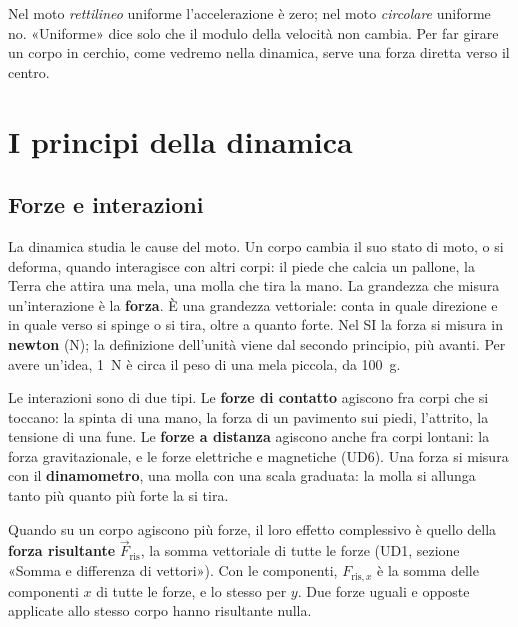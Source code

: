 \begin{attenzione}
Nel moto \emph{rettilineo} uniforme l'accelerazione è zero; nel moto \emph{circolare} uniforme no. «Uniforme» dice solo che il modulo della velocità non cambia. Per far girare un corpo in cerchio, come vedremo nella dinamica, serve una forza diretta verso il centro.
\end{attenzione}



\section{I principi della dinamica}
\label{sec:ud2-principi}

\subsection{Forze e interazioni}

La dinamica studia le cause del moto. Un corpo cambia il suo stato di moto, o si deforma, quando interagisce con altri corpi: il piede che calcia un pallone, la Terra che attira una mela, una molla che tira la mano. La grandezza che misura un'interazione è la \textbf{forza}. È una grandezza vettoriale: conta in quale direzione e in quale verso si spinge o si tira, oltre a quanto forte. Nel SI la forza si misura in \textbf{newton} (\si{\newton}); la definizione dell'unità viene dal secondo principio, più avanti. Per avere un'idea, \SI{1}{\newton} è circa il peso di una mela piccola, da \SI{100}{\gram}.

Le interazioni sono di due tipi. Le \textbf{forze di contatto} agiscono fra corpi che si toccano: la spinta di una mano, la forza di un pavimento sui piedi, l'attrito, la tensione di una fune. Le \textbf{forze a distanza} agiscono anche fra corpi lontani: la forza gravitazionale, e le forze elettriche e magnetiche (UD6). Una forza si misura con il \textbf{dinamometro}, una molla con una scala graduata: la molla si allunga tanto più quanto più forte la si tira.

Quando su un corpo agiscono più forze, il loro effetto complessivo è quello della \textbf{forza risultante} $\vec F_{\text{ris}}$, la somma vettoriale di tutte le forze (UD1, sezione «Somma e differenza di vettori»). Con le componenti, $F_{\text{ris},x}$ è la somma delle componenti $x$ di tutte le forze, e lo stesso per $y$. Due forze uguali e opposte applicate allo stesso corpo hanno risultante nulla.

